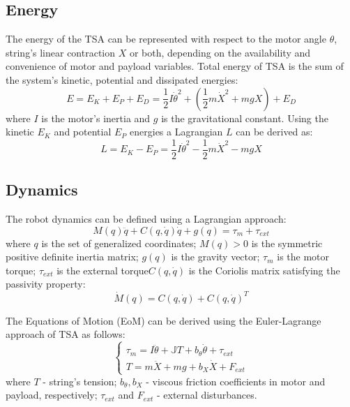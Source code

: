 \subsection{Energy}

The energy of the TSA can be represented with respect to the motor angle $\theta$, string's linear contraction $X$ or both, depending on the availability and convenience of motor and payload variables. Total energy of TSA is the sum of the system's kinetic, potential and dissipated energies:
\begin{equation}
    E = E_K + E_P + E_D = \frac{1}{2}I\dot\theta^2 + (\frac{1}{2}m\dot X^2 + mgX) + E_D
\end{equation}
where $I$ is the motor's inertia and $g$ is the gravitational constant. 
Using the kinetic $E_K$ and potential $E_P$ energies a Lagrangian $L$ can be derived as:
\begin{equation}
    L = E_K - E_P = \frac{1}{2}I\dot \theta^2 - \frac{1}{2}m\dot{X}^2 - mgX
\end{equation}


\subsection{Dynamics}
The robot dynamics can be defined using a Lagrangian approach:
\begin{equation}
    M(q)\ddot q + C(q,\dot q)\dot q + g(q) = \tau_m + \tau_{ext}
\end{equation}
where $q$ is the set of generalized coordinates; $M(q)>0$ is the symmetric positive definite inertia matrix;  $g(q)$ is the gravity vector; $\tau_m$ is the motor torque; $\tau_{ext}$ is the external torque$C(q,\dot q)$ is the Coriolis matrix satisfying the passivity property:
\begin{equation}
    \dot M(q) = C(q,\dot q) +  C(q,\dot q)^T 
\end{equation}

The Equations of Motion (EoM) can be derived using the Euler-Lagrange approach of TSA as follows:
\begin{equation}
    \begin{cases}
        \tau_m = I\ddot \theta + \mathbb{J}T + b_{\theta}\dot \theta + \tau_{ext} \\
        T = m\ddot X +mg+ b_X\dot X + F_{ext}
    \end{cases}
\end{equation}
where  $T$ - string's tension; $b_{\theta}, b_X$ - viscous friction coefficients in motor and payload, respectively; $\tau_{ext}$ and $F_{ext}$ - external disturbances.

